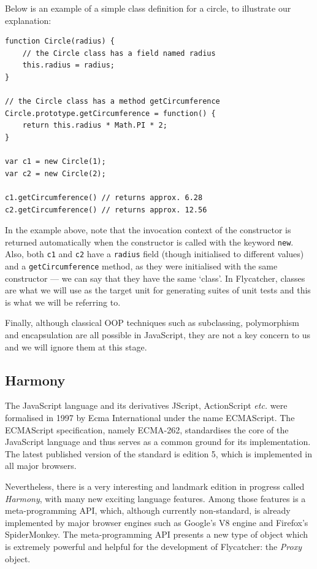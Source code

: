 Below is an example of a simple class definition for a circle, to illustrate our explanation:

\begin{lstlisting}
function Circle(radius) {
    // the Circle class has a field named radius
    this.radius = radius;
}

// the Circle class has a method getCircumference
Circle.prototype.getCircumference = function() {
    return this.radius * Math.PI * 2;
}

var c1 = new Circle(1);
var c2 = new Circle(2);

c1.getCircumference() // returns approx. 6.28
c2.getCircumference() // returns approx. 12.56

\end{lstlisting}

In the example above, note that the invocation context of the constructor is returned automatically when the constructor is called with the keyword \texttt{new}. Also, both \texttt{c1} and \texttt{c2} have a \texttt{radius} field (though initialised to different values) and a \texttt{getCircumference} method, as they were initialised with the same constructor --- we can say that they have the same `class'. In \textsf{Flycatcher}, classes are what we will use as the target unit for generating suites of unit tests and this is what we will be referring to.

Finally, although classical OOP techniques such as subclassing, polymorphism and encapsulation are all possible in JavaScript, they are not a key concern to us and we will ignore them at this stage.

\subsection{Harmony}
The JavaScript language and its derivatives JScript, ActionScript \emph{etc.} were formalised in 1997 by Ecma International under the name ECMAScript. The ECMAScript specification, namely ECMA-262, standardises the core of the JavaScript language and thus serves as a common ground for its implementation. The latest published version of the standard is edition 5, which is implemented in all major browsers.

Nevertheless, there is a very interesting and landmark edition in progress called \emph{Harmony}, with many new exciting language features. Among those features is a meta-programming API, which, although currently non-standard, is already implemented by major browser engines such as Google's V8 engine and Firefox's SpiderMonkey. The meta-programming API presents a new type of object which is extremely powerful and helpful for the development of \textsf{Flycatcher}: the \emph{Proxy} object.

